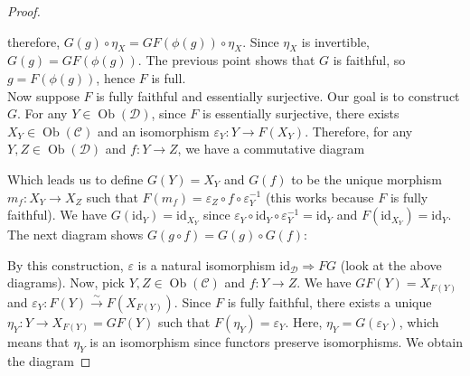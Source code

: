 \documentclass{article}
\newcommand{\id}{\mathrm{id}}
\newcommand{\cat}{\mathcal{C}}
\newcommand{\catt}{\mathcal{D}}
\DeclareMathOperator{\Ob}{Ob}
\renewcommand{\epsilon}{\varepsilon}
\theoremstyle{plain}
\theoremstyle{definition}
\theoremstyle{remark}
\begin{document}
\begin{proof}
\begin{center}
    \end{center}
    therefore, $G(g) \circ \eta_X = GF(\phi(g)) \circ \eta_X$.
    Since $\eta_X$ is invertible, $G(g) = GF(\phi(g))$. The previous point shows that $G$ is faithful, so $g = F(\phi(g))$, hence $F$ is full. \\
    Now suppose $F$ is fully faithful and essentially surjective. Our goal is to construct $G$. For any $Y \in \Ob(\catt)$, since $F$ is essentially surjective, there exists $X_Y \in \Ob(\cat)$ and an isomorphism $\epsilon_Y : Y \to F(X_Y)$. Therefore, for any $Y,Z\in \Ob(\catt)$ and $f:Y \to Z$, we have a commutative diagram
    \begin{center}
    \end{center}
    Which leads us to define $G(Y) = X_Y$ and $G(f)$ to be the unique morphism $m_f : X_Y \to X_Z$ such that $F(m_f) = \epsilon_Z \circ f \circ \epsilon_Y^{-1}$ (this works because $F$ is fully faithful). We have $G(\id_Y) = \id_{X_Y}$ since $\varepsilon_Y \circ \id_Y \circ \varepsilon_Y^{-1} = \id_Y$ and $F(\id_{X_Y}) = \id_Y$. The next diagram shows $G(g\circ f) = G(g)\circ G(f)$:
    \begin{center}
    \end{center}
    By this construction, $\epsilon$ is a natural isomorphism $\id_\catt \Rightarrow FG$ (look at the above diagrams). Now, pick $Y,Z\in \Ob(\cat)$ and $f : Y \to Z$. We have $GF(Y) = X_{F(Y)}$ and $\varepsilon_Y : F(Y) \xrightarrow{\sim} F(X_{F(Y)})$. Since $F$ is fully faithful, there exists a unique $\eta_Y : Y \to X_{F(Y)} = GF(Y)$ such that $F(\eta_Y) = \varepsilon_Y$. Here, $\eta_Y = G(\epsilon_Y)$, which means that $\eta_Y$ is an isomorphism since functors preserve isomorphisms. We obtain the diagram

\end{proof}
\end{document}
